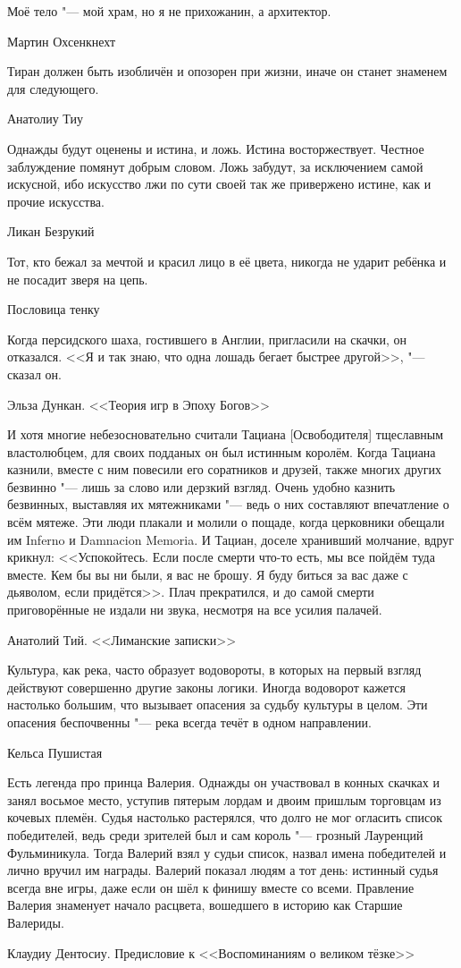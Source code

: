 \epigraph
{Моё тело "--- мой храм, но я не прихожанин, а архитектор.}
{Мартин Охсенкнехт}

\epigraph
{Тиран должен быть изобличён и опозорен при жизни, иначе он станет знаменем для следующего.}
{Анатолиу Тиу}

\epigraph
{Однажды будут оценены и истина, и ложь.
Истина восторжествует.
Честное заблуждение помянут добрым словом.
Ложь забудут, за исключением самой искусной, ибо искусство лжи по сути своей так же привержено истине, как и прочие искусства.}
{Ликан Безрукий}

\epigraph
{Тот, кто бежал за мечтой и красил лицо в её цвета, никогда не ударит ребёнка и не посадит зверя на цепь.}
{Пословица тенку}

\epigraph
{Когда персидского шаха, гостившего в Англии, пригласили на скачки, он отказался.
<<Я и так знаю, что одна лошадь бегает быстрее другой>>, "--- сказал он.}
{Эльза Дункан.
<<Теория игр в Эпоху Богов>>}

\epigraph
{\ldotst И хотя многие небезосновательно считали Тациана [Освободителя] тщеславным властолюбцем, для своих подданых он был истинным королём.
Когда Тациана казнили, вместе с ним повесили его соратников и друзей, также многих других безвинно "--- лишь за слово или дерзкий взгляд.
Очень удобно казнить безвинных, выставляя их мятежниками "--- ведь о них составляют впечатление о всём мятеже.
Эти люди плакали и молили о пощаде, когда церковники обещали им Inferno\footnotemark{} и Damnacion Memoria\footnotemark.
И Тациан, доселе хранивший молчание, вдруг крикнул: <<Успокойтесь.
Если после смерти что-то есть, мы все пойдём туда вместе.
Кем бы вы ни были, я вас не брошу.
Я буду биться за вас даже с дьяволом, если придётся>>.
Плач прекратился, и до самой смерти приговорённые не издали ни звука, несмотря на все усилия палачей.}
{Анатолий Тий.
<<Лиманские записки>>}

\epigraph
{Культура, как река, часто образует водовороты, в которых на первый взгляд действуют совершенно другие законы логики.
Иногда водоворот кажется настолько большим, что вызывает опасения за судьбу культуры в целом.
Эти опасения беспочвенны "--- река всегда течёт в одном направлении.}
{Кельса Пушистая}

\epigraph
{Есть легенда про принца Валерия.
Однажды он участвовал в конных скачках и занял восьмое место, уступив пятерым лордам и двоим пришлым торговцам из кочевых племён.
Судья настолько растерялся, что долго не мог огласить список победителей, ведь среди зрителей был и сам король "--- грозный Лауренций Фульминикула.
Тогда Валерий взял у судьи список, назвал имена победителей и лично вручил им награды.
Валерий показал людям а тот день: истинный судья всегда вне игры, даже если он шёл к финишу вместе со всеми.
Правление Валерия знаменует начало расцвета, вошедшего в историю как Старшие Валериды.}
{Клаудиу Дентосиу.
Предисловие к <<Воспоминаниям о великом тёзке>>}

